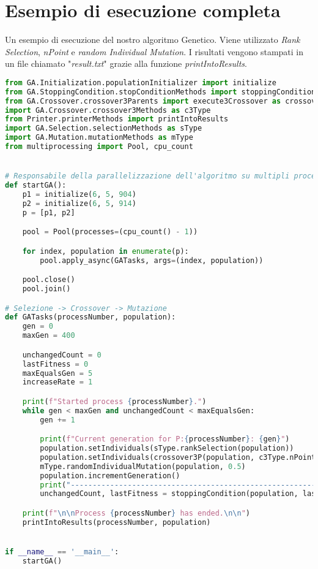 \documentclass{article}
\begin{document}
\section{Esempio di esecuzione completa}
Un esempio di esecuzione del nostro algoritmo Genetico. Viene utilizzato \textit{Rank Selection}, \textit{nPoint} e \textit{random Individual Mutation}. I risultati vengono stampati in un file chiamato "\textit{result.txt}" grazie alla funzione \textit{printIntoResults}.
\begin{lstlisting}[language = Python]
from GA.Initialization.populationInitializer import initialize
from GA.StoppingCondition.stopConditionMethods import stoppingCondition
from GA.Crossover.crossover3Parents import execute3Crossover as crossover3P
import GA.Crossover.crossover3Methods as c3Type
from Printer.printerMethods import printIntoResults
import GA.Selection.selectionMethods as sType
import GA.Mutation.mutationMethods as mType
from multiprocessing import Pool, cpu_count


# Responsabile della parallelizzazione dell'algoritmo su multipli processi
def startGA():
    p1 = initialize(6, 5, 904)
    p2 = initialize(6, 5, 914)
    p = [p1, p2]

    pool = Pool(processes=(cpu_count() - 1))

    for index, population in enumerate(p):
        pool.apply_async(GATasks, args=(index, population))

    pool.close()
    pool.join()

# Selezione -> Crossover -> Mutazione
def GATasks(processNumber, population):
    gen = 0
    maxGen = 400

    unchangedCount = 0
    lastFitness = 0
    maxEqualsGen = 5
    increaseRate = 1

    print(f"Started process {processNumber}.")
    while gen < maxGen and unchangedCount < maxEqualsGen:
        gen += 1

        print(f"Current generation for P:{processNumber}: {gen}")
        population.setIndividuals(sType.rankSelection(population))
        population.setIndividuals(crossover3P(population, c3Type.nPoint, 2))
        mType.randomIndividualMutation(population, 0.5)
        population.incrementGeneration()
        print("--------------------------------------------------------------------")
        unchangedCount, lastFitness = stoppingCondition(population, lastFitness, unchangedCount, increaseRate)

    print(f"\n\nProcess {processNumber} has ended.\n\n")
    printIntoResults(processNumber, population)


if __name__ == '__main__':
    startGA()
\end{lstlisting}
\end{document}
